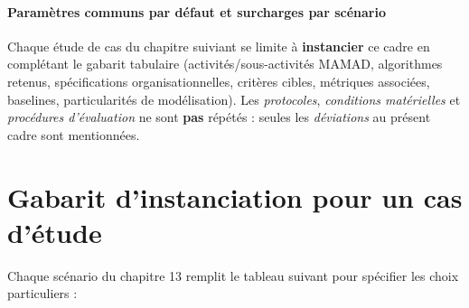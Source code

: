 \paragraph{Paramètres communs par défaut et surcharges par scénario}
\begin{table}[h!]
  \centering
  \caption{Paramètres communs (défauts) et points de surcharge par scénario}
\end{table}

Chaque étude de cas du chapitre suiviant se limite à \textbf{instancier} ce cadre en complétant le gabarit tabulaire (activités/sous-activités MAMAD, algorithmes retenus, spécifications organisationnelles, critères cibles, métriques associées, baselines, particularités de modélisation). Les \textit{protocoles}, \textit{conditions matérielles} et \textit{procédures d’évaluation} ne sont \textbf{pas} répétés : seules les \textit{déviations} au présent cadre sont mentionnées.


\section{Gabarit d’instanciation pour un cas d’étude}
Chaque scénario du chapitre 13 remplit le tableau suivant pour spécifier les choix particuliers :

